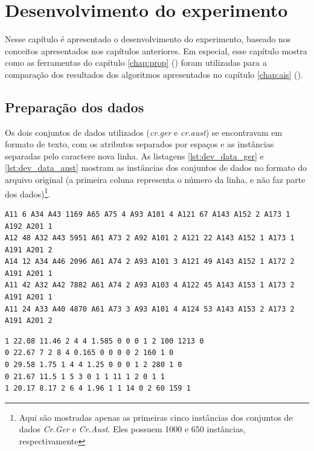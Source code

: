 \chapter{Desenvolvimento do experimento}

Nesse capítulo é apresentado o desenvolvimento do experimento, baseado nos conceitos apresentados nos capítulos anteriores. Em especial, esse capítulo mostra como as ferramentas do capítulo \ref{chap:prop} () foram utilizadas para a comparação dos resultados dos algoritmos apresentados no capítulo \ref{chap:ais} ().

\section{Preparação dos dados}

Os dois conjuntos de dados utilizados (\emph{cr.ger} e \emph{cr.aust}) se encontravam em formato de texto, com os atributos separados por espaços e as instâncias separadas pelo caractere nova linha. As listagens \ref{lst:dev_data_ger} e \ref{lst:dev_data_aust} mostram as instâncias dos conjuntos de dados no formato do arquivo original (a primeira coluna representa o número da linha, e não faz parte dos dados)\footnote{Aqui são mostradas apenas as primeiras cinco instâncias dos conjuntos de dados \emph{Cr.Ger} e \emph{Cr.Aust}. Eles possuem 1000 e 650 instâncias, respectivamente}.

\vspace{0.5cm}
\begin{lstlisting}[caption=Formato original dos dados (\emph{Cr.Ger}), label=lst:dev_data_ger]
A11 6 A34 A43 1169 A65 A75 4 A93 A101 4 A121 67 A143 A152 2 A173 1 A192 A201 1
A12 48 A32 A43 5951 A61 A73 2 A92 A101 2 A121 22 A143 A152 1 A173 1 A191 A201 2
A14 12 A34 A46 2096 A61 A74 2 A93 A101 3 A121 49 A143 A152 1 A172 2 A191 A201 1
A11 42 A32 A42 7882 A61 A74 2 A93 A103 4 A122 45 A143 A153 1 A173 2 A191 A201 1
A11 24 A33 A40 4870 A61 A73 3 A93 A101 4 A124 53 A143 A153 2 A173 2 A191 A201 2
\end{lstlisting}
\vspace{0.5cm}

\vspace{0.5cm}
\begin{lstlisting}[caption=Formato original dos dados (\emph{Cr.Aust}), label=lst:dev_data_aust]
1 22.08 11.46 2 4 4 1.585 0 0 0 1 2 100 1213 0
0 22.67 7 2 8 4 0.165 0 0 0 0 2 160 1 0
0 29.58 1.75 1 4 4 1.25 0 0 0 1 2 280 1 0
0 21.67 11.5 1 5 3 0 1 1 11 1 2 0 1 1
1 20.17 8.17 2 6 4 1.96 1 1 14 0 2 60 159 1
\end{lstlisting}
\vspace{0.5cm}

